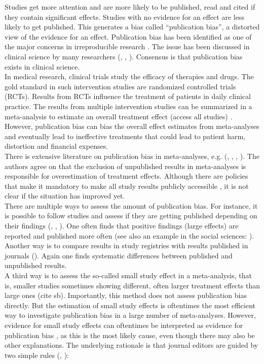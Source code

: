 \documentclass[11pt,a4paper,twoside]{book}\usepackage[]{graphicx}\usepackage[]{color}
\begin{document}
Studies get more attention and are more likely to be published, read and cited if they contain significant effects. Studies with no evidence for an effect are less likely to get published. This generates a bias called ``publication bias'', a distorted view of the evidence for an effect. Publication bias has been identified as one of the major concerns in irreproducible research \citep{Bishop.2019}. The issue has been discussed in clinical science by many researchers (\citet{pb.clinicalscience1}, \citet{sterne2001}, \citet{Dwan2013}). Consensus is that publication bias exists in clinical science. \\
In medical research, clinical trials study the efficacy of therapies and drugs. The gold standard in such intervention studies are randomized controlled trials (RCTs). Results from RCTs influence the treatment of patients in daily clinical practice. The results from multiple intervention studies can be summarized in a meta-analysis to estimate an overall treatment effect (access all studies) \citep{Cochran}. However, publication bias can bias the overall effect estimates from meta-analyses and eventually lead to ineffective treatments that could lead to patient harm, distortion and financial expenses. \\
There is extensive literature on publication bias in meta-analyses, e.g. (\citet{pb.clinicalscience.2013}, %
\citet{grey.literature.4}, \citet{grey.literature.3}, \citet{grey.literature.2}).
The authors agree on that the exclusion of unpublished results in meta-analyses is responsible for overestimation of treatment effects. Although there are policies that make it mandatory to make all study results publicly accessible \citep{fda}, it is not clear if the situation has improved yet.\\
There are multiple ways to assess the amount of publication bias. For instance, it is possible to follow studies and assess if they are getting published depending on their findings (\citet{Dwan2013}, \citet{publication.fate}, \citet{Lee.2008}). One often finds that positive findings (\ie large effects) are reported and published more often (see also an example in the social sciences: \citet{social.sciences.publication.bias}). Another way is to compare results in study registries with results published in journals (\eg \citet{pb.clinicalscience.2013}). Again one finds systematic differences between published and unpublished results. \\
A third way is to assess the so-called small study effect in a meta-analysis, that is, smaller studies sometimes showing different, often larger treatment effects than large ones (cite sb). Importantly, this method does not assess publication bias directly. But the estimation of small study effects is oftentimes the most efficient way to investigate publication bias in a large number of meta-analyses. However, evidence for small study effects can oftentimes be interpreted as evidence for publication bias \citep{Egger}, as this is the most likely cause, even though there may also be other explanations. The underlying rationale is that journal editors are guided by two simple rules (\citet{excess.significance}, \citet{ioannidis.2019}): 
\end{document}
